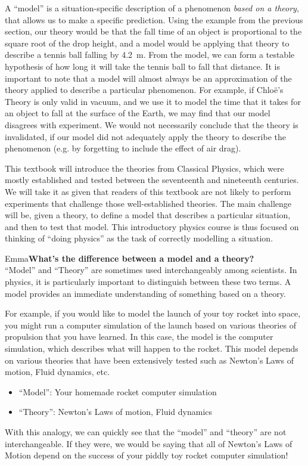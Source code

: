 A ``model'' is a situation-specific description of a phenomenon \textit{based on a theory}, that allows us to make a specific prediction. Using the example from the previous section, our theory would be that the fall time of an object is proportional to the square root of the drop height, and a model would be applying that theory to describe a tennis ball falling by \SI{4.2}{\meter}. From the model, we can form a testable hypothesis of how long it will take the tennis ball to fall that distance. It is important to note that a model will almost always be an approximation of the theory applied to describe a particular phenomenon. For example, if Chlo\"e's Theory is only valid in vacuum, and we use it to model the time that it takes for an object to fall at the surface of the Earth, we may find that our model disagrees with experiment. We would not necessarily conclude that the theory is invalidated, if our model did not adequately apply the theory to describe the phenomenon (e.g. by forgetting to include the effect of air drag).

This textbook will introduce the theories from Classical Physics, which were mostly established and tested between the seventeenth and nineteenth centuries. We will take it as given that readers of this textbook are not likely to perform experiments that challenge those well-established theories. The main challenge will be, given a theory, to define a model that describes a particular situation, and then to test that model. This introductory physics course is thus focused on thinking of ``doing physics'' as the task of correctly modelling a situation.

\begin{studentOpinion}{Emma}{\textbf{What's the difference between a model and a theory?}}\\
``Model'' and ``Theory'' are sometimes used interchangeably among scientists. In physics, it is particularly important to distinguish between these two terms. A model provides an immediate understanding of something based on a theory. 

For example, if you would like to model the launch of your toy rocket into space, you might run a computer simulation of the launch based on various theories of propulsion that you have learned. In this case, the model is the computer simulation, which describes what will happen to the rocket. This model depends on various theories that have been extensively tested such as Newton's Laws of motion, Fluid dynamics, etc. 
\begin{itemize}
\item``Model'': Your homemade rocket computer simulation
\item``Theory'': Newton's Laws of motion, Fluid dynamics
\end{itemize}
With this analogy, we can quickly see that the ``model'' and ``theory'' are not interchangeable. If they were, we would be saying that all of Newton's Laws of Motion depend on the success of your piddly toy rocket computer simulation!
\end{studentOpinion}

